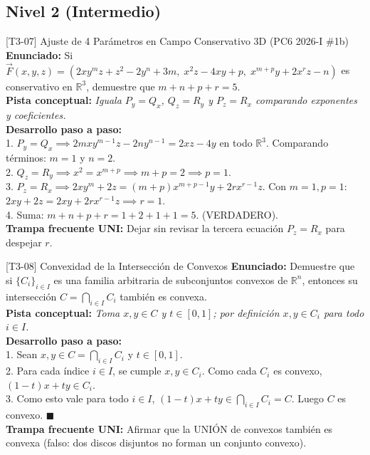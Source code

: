 \documentclass[11pt,a4paper]{article}
\begin{document}
\subsection{Nivel 2 (Intermedio)}

\begin{ejerciciobox}{[T3-07] Ajuste de 4 Parámetros en Campo Conservativo 3D (PC6 2026-I \#1b)}
\textbf{Enunciado:} Si $\vec{F}(x,y,z) = (2xy^m z + z^2 - 2y^n + 3m,\; x^2 z - 4xy + p,\; x^{m+p}y + 2x^r z - n)$ es conservativo en $\mathbb{R}^3$, demuestre que $m + n + p + r = 5$.\\[0.2cm]
\textbf{Pista conceptual:} \emph{Iguala $P_y = Q_x$, $Q_z = R_y$ y $P_z = R_x$ comparando exponentes y coeficientes.}\\[0.2cm]
\textbf{Desarrollo paso a paso:}\\
1. $P_y = Q_x \implies 2mxy^{m-1}z - 2ny^{n-1} = 2xz - 4y$ en todo $\mathbb{R}^3$. Comparando términos: $m = 1$ y $n = 2$.\\
2. $Q_z = R_y \implies x^2 = x^{m+p} \implies m + p = 2 \implies p = 1$.\\
3. $P_z = R_x \implies 2xy^m + 2z = (m+p)x^{m+p-1}y + 2rx^{r-1}z$. Con $m=1, p=1$: $2xy + 2z = 2xy + 2rx^{r-1}z \implies r = 1$.\\
4. Suma: $m + n + p + r = 1 + 2 + 1 + 1 = 5$. (VERDADERO).\\[0.2cm]
\textbf{Trampa frecuente UNI:} Dejar sin revisar la tercera ecuación $P_z = R_x$ para despejar $r$.
\end{ejerciciobox}

\begin{ejerciciobox}{[T3-08] Convexidad de la Intersección de Convexos}
\textbf{Enunciado:} Demuestre que si $\{C_i\}_{i \in I}$ es una familia arbitraria de subconjuntos convexos de $\mathbb{R}^n$, entonces su intersección $C = \bigcap_{i \in I} C_i$ también es convexa.\\[0.2cm]
\textbf{Pista conceptual:} \emph{Toma $x, y \in C$ y $t \in [0,1]$; por definición $x, y \in C_i$ para todo $i \in I$.}\\[0.2cm]
\textbf{Desarrollo paso a paso:}\\
1. Sean $x, y \in C = \bigcap_{i \in I} C_i$ y $t \in [0,1]$.\\
2. Para cada índice $i \in I$, se cumple $x, y \in C_i$. Como cada $C_i$ es convexo, $(1-t)x + ty \in C_i$.\\
3. Como esto vale para todo $i \in I$, $(1-t)x + ty \in \bigcap_{i \in I} C_i = C$. Luego $C$ es convexo. $\blacksquare$\\[0.2cm]
\textbf{Trampa frecuente UNI:} Afirmar que la UNIÓN de convexos también es convexa (falso: dos discos disjuntos no forman un conjunto convexo).
\end{ejerciciobox}
\end{document}
